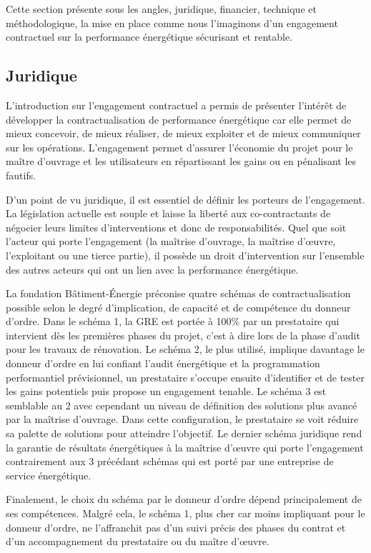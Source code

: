 Cette section présente sous les angles, juridique, financier, technique et méthodologique, la mise en place comme nous l'imaginons d'un engagement contractuel sur la performance énergétique sécurisant et rentable. 

\subsection{Juridique}

L'introduction sur l'engagement contractuel a permis de présenter l'intérêt de développer la contractualisation de performance énergétique car elle permet de mieux concevoir, de mieux réaliser, de mieux exploiter et de mieux communiquer sur les opérations. L'engagement permet d'assurer l'économie du projet pour le maître d'ouvrage et les utilisateurs en répartissant les gains ou en pénalisant les fautifs. 

D'un point de vu juridique, il est essentiel de définir les porteurs de l'engagement. La législation actuelle est souple et laisse la liberté aux co-contractants de négocier leurs limites d'interventions et donc de responsabilités. Quel que soit l'acteur qui porte l'engagement (la maîtrise d'ouvrage, la maîtrise d'œuvre, l'exploitant ou une tierce partie), il possède un droit d'intervention sur l'ensemble des autres acteurs qui ont un lien avec la performance énergétique.

La fondation Bâtiment-Énergie \cite{FBE-16} préconise quatre schémas de contractualisation possible selon le degré d'implication, de capacité et de compétence du donneur d'ordre. Dans le schéma 1, la GRE est portée à 100\% par un prestataire qui intervient dès les premières phases du projet, c'est à dire lors de la phase d'audit pour les travaux de rénovation. Le schéma 2, le plus utilisé, implique davantage le donneur d'ordre en lui confiant l'audit énergétique et la programmation performantiel prévisionnel, un prestataire s'occupe ensuite d'identifier et de tester les gains potentiels puis propose un engagement tenable. Le schéma 3 est semblable au 2 avec cependant un niveau de définition des solutions plus avancé par la maîtrise d'ouvrage. Dans cette configuration, le prestataire se voit réduire sa palette de solutions pour atteindre l'objectif. Le dernier schéma juridique rend la garantie de résultats énergétiques à la maîtrise d'œuvre qui porte l'engagement contrairement aux 3 précédant schémas qui est porté par une entreprise de service énergétique. 

Finalement, le choix du schéma par le donneur d'ordre dépend principalement de ses compétences. Malgré cela, le schéma 1, plus cher car moins impliquant pour le donneur d'ordre, ne l'affranchit pas d'un suivi précis des phases du contrat et d'un accompagnement du prestataire ou du maître d'œuvre.

